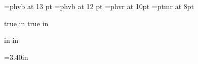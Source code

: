 %
%
%






\typosize[10/11.5]
\font\biggest=phvb at 13 pt
\font\bigger=phvb at 12 pt
\font\smalltitle =phvr at 10pt
\font\smallfont=ptmr at 8pt

\sloppy

\newif\iflong %
\longfalse
\def\piflong#1{\iflong#1
\else\fi}%
\long\def\lpiflong#1{\iflong#1
\else\fi}%

\def\xpair{{x_1,x_2}}

 true in
 true in
\nopagenumbers

\def\complex{{\bf C}}
\def\real{{\bf R}}
\def\field{{\bf F}}
\def\bigJ{\bf \hat J^2}

 in
 in
\hsize=10.6in
\vsize=8.05in
\parindent=0pt


\def\strutA#1#2{\vrule height#1 depth#2 width0pt}
\def\chapter{\vskip 5pt \bigger}
\def\hthree{\vskip 2pt \smalltitle}

=3.40in
\newbox\bigbox


\def\dtablestart#1#2{\halign\bgroup \vtop{\parindent=0pt\hsize=#1\strut##\strut}\hfil&\hskip 0.10 in\vtop{\parindent=0pt\hsize=#2\strut##\strut}\cr}
\def\dtableend{\egroup}



